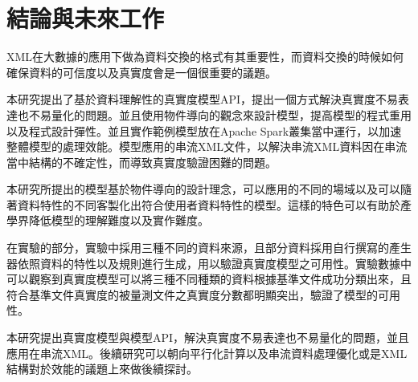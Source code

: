 \section{結論與未來工作}

XML在大數據的應用下做為資料交換的格式有其重要性，而資料交換的時候如何確保資料的可信度以及真實度會是一個很重要的議題。\\\par
本研究提出了基於資料理解性的真實度模型API，提出一個方式解決真實度不易表達也不易量化的問題。並且使用物件導向的觀念來設計模型，提高模型的程式重用以及程式設計彈性。並且實作範例模型放在Apache Spark叢集當中運行，以加速整體模型的處理效能。模型應用的串流XML文件，以解決串流XML資料因在串流當中結構的不確定性，而導致真實度驗證困難的問題。\\\par
本研究所提出的模型基於物件導向的設計理念，可以應用的不同的場域以及可以隨著資料特性的不同客製化出符合使用者資料特性的模型。這樣的特色可以有助於產學界降低模型的理解難度以及實作難度。\\\par
在實驗的部分，實驗中採用三種不同的資料來源，且部分資料採用自行撰寫的產生器依照資料的特性以及規則進行生成，用以驗證真實度模型之可用性。實驗數據中可以觀察到真實度模型可以將三種不同種類的資料根據基準文件成功分類出來，且符合基準文件真實度的被量測文件之真實度分數都明顯突出，驗證了模型的可用性。\\\par

本研究提出真實度模型與模型API，解決真實度不易表達也不易量化的問題，並且應用在串流XML。後續研究可以朝向平行化計算以及串流資料處理優化或是XML結構對於效能的議題上來做後續探討。